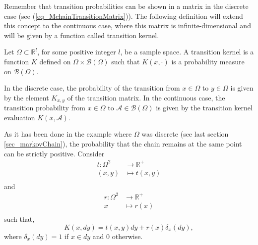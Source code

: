 Remember that transition probabilities can be shown in a matrix in the discrete case (see (\ref{eq_MchainTransitionMatrix})). The following definition will extend this concept to the continuous case, where this matrix is infinite-dimensional and will be given by a function called transition kernel.

\begin{definition} \label{def_transitionKernel}
  Let $\Omega \subset \mathbb{R}^l$, for some positive integer $l$, be a sample space. A transition kernel is a function $K$ defined on $\Omega \times \mathcal{B}(\Omega)$ such that $K(x,\cdot)$ is a probability measure on $\mathcal{B}(\Omega)$.
\end{definition}


\begin{remark}
  In the discrete case, the probability of the transition from $x\in\Omega$ to $y\in\Omega$ is given by the element $K_{x,y}$ of the transition matrix.
  In the continuous case, the transition probability from $x\in\Omega$ to $\mathcal{A}\in\mathcal{B}(\Omega)$ is given by the transition kernel evaluation $K(x,\mathcal{A})$.
\end{remark}

As it has been done in the example where $\Omega$ was discrete (see last section \ref{sec_markovChain}), the probability that the chain remains at the same point can be strictly positive. 
Consider 
$$
 \begin{aligned}
  t: \Omega^2 &\to \mathbb{R}^+ \\
     (x,y)   &\mapsto t(x,y) \\
 \end{aligned}
$$
and
$$
 \begin{aligned}
  r: \Omega^2 &\to \mathbb{R}^+ \\
         x    &\mapsto r(x) \\
 \end{aligned} 
$$
such that,
\begin{equation} \label{eq_transitionKernelDescomposition}
  K(x,dy) = t(x,y)dy + r(x)\delta_x(dy),
\end{equation}
where $\delta_x(dy) = 1$ if $x\in dy$ and $0$ otherwise.

